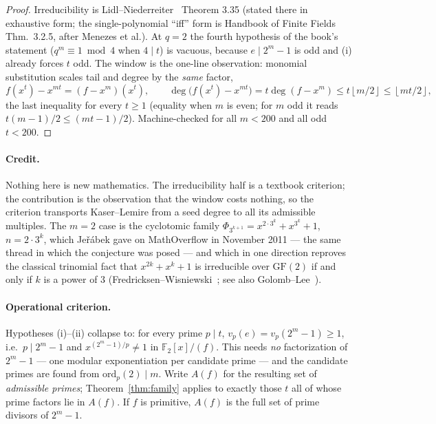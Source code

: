 \documentclass[10pt]{article}
\theoremstyle{plain}
\theoremstyle{definition}
\newcommand{\F}{\mathbb F}
\newcommand{\flr}[1]{\left\lfloor #1\right\rfloor}
\begin{document}
\begin{proof}
Irreducibility is Lidl--Niederreiter~\cite{LN} Theorem 3.35 (stated there in
exhaustive form; the single-polynomial ``iff'' form is Handbook of Finite
Fields~\cite{Handbook} Thm.\ 3.2.5, after Menezes et al.). At $q=2$ the fourth
hypothesis of the book's statement ($q^m\equiv1\bmod4$ when $4\mid t$) is
vacuous, because $e\mid2^m-1$ is odd and (i) already forces $t$ odd. The window
is the one-line observation: monomial substitution scales tail and degree by
the \emph{same} factor,
\[
 f(x^t)-x^{mt}=(f-x^m)(x^t),
 \qquad
 \deg\bigl(f(x^t)-x^{mt}\bigr)=t\deg(f-x^m)\le t\flr{m/2}\le\flr{mt/2},
\]
the last inequality for every $t\ge1$ (equality when $m$ is even; for $m$ odd it
reads $t(m-1)/2\le(mt-1)/2$). Machine-checked for all $m<200$ and all odd
$t<200$.
\end{proof}

\paragraph{Credit.} Nothing here is new mathematics. The irreducibility half is
a textbook criterion; the contribution is the observation that the window costs
nothing, so the criterion transports Kaser--Lemire from a seed degree to all
its admissible multiples. The $m=2$ case is the cyclotomic family
$\Phi_{3^{k+1}}=x^{2\cdot3^k}+x^{3^k}+1$, $n=2\cdot3^k$, which
Je\v{r}\'abek gave on MathOverflow in November 2011 --- the same thread in
which the conjecture was posed --- and which in one direction reproves the
classical trinomial fact that $x^{2k}+x^k+1$ is irreducible over $\mathrm{GF}(2)$
if and only if $k$ is a power of $3$ (Fredricksen--Wisniewski~\cite{FW};
see also Golomb--Lee~\cite{GolombLee}).

\paragraph{Operational criterion.} Hypotheses (i)--(ii) collapse to: for every
prime $p\mid t$, $v_p(e)=v_p(2^m-1)\ge1$, i.e.\ $p\mid2^m-1$ and
$x^{(2^m-1)/p}\ne1$ in $\F_2[x]/(f)$. This needs \emph{no} factorization of
$2^m-1$ --- one modular exponentiation per candidate prime --- and the candidate
primes are found from $\mathrm{ord}_p(2)\mid m$. Write $A(f)$ for the resulting
set of \emph{admissible primes}; Theorem~\ref{thm:family} applies to exactly
those $t$ all of whose prime factors lie in $A(f)$. If $f$ is primitive, $A(f)$
is the full set of prime divisors of $2^m-1$.
\end{document}
